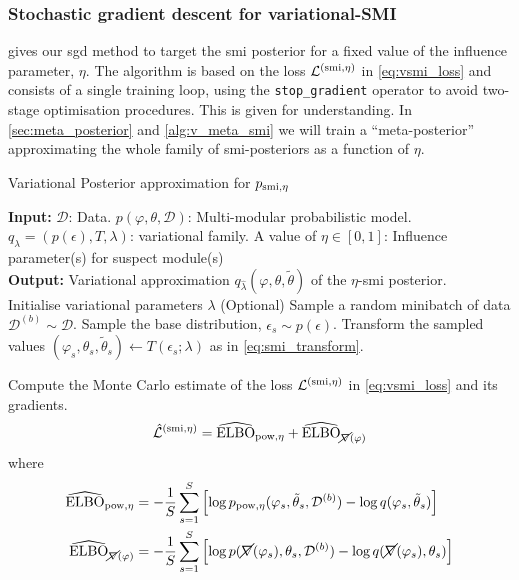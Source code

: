\subsubsection{Stochastic gradient descent for variational-SMI}
 gives our \acrlong*{sgd} method to target the \acrshort*{smi} posterior for a fixed value of the influence parameter, $\eta$.
The algorithm is based on the loss $\mathcal{L}^{( \operatorname{\text{smi}}, \eta)}$ in \cref{eq:vsmi_loss} and consists of a single training loop, using the \verb|stop_gradient| operator to avoid two-stage optimisation procedures. This is given for understanding. In \cref{sec:meta_posterior} and \cref{alg:v_meta_smi} we will train a ``meta-posterior'' approximating the whole family of \acrshort*{smi}-posteriors as a function of $\eta$.
 
\begin{algorithm}[tb]
  \caption{Variational Posterior approximation for $p_{ \operatorname{\text{smi}}, \eta}$} \label{alg:vsmi}
  \begin{algorithmic}
    \STATE \textbf{Input:} $\mathcal{D}$: Data. $p(\varphi,\theta,\mathcal{D})$: Multi-modular probabilistic model. $q_\lambda=(p(\epsilon), T, \lambda)$: variational family. A value of $\eta \in [0,1]$: Influence parameter(s) for suspect module(s) \\[0.1in]
    \STATE \textbf{Output:} Variational approximation $q_{\hat\lambda}(\varphi,\theta,\tilde\theta)$ of the $\eta$-\acrshort*{smi} posterior. \\[0.1in]

    \STATE Initialise variational parameters $\lambda$
    \STATE (Optional) Sample a random minibatch of data $\mathcal{D}^{(b)} \sim \mathcal{D}$.
    \STATE Sample the base distribution, $\epsilon_s \sim p(\epsilon)$.
    \STATE Transform the sampled values $(\varphi_s, \theta_s, \tilde\theta_s) \leftarrow T(\epsilon_s; \lambda)$ as in \cref{eq:smi_transform}.
    \ENDFOR

    \STATE Compute the Monte Carlo estimate of the loss $\mathcal{L}^{( \operatorname{\text{smi}}, \eta)}$ in \cref{eq:vsmi_loss} and its gradients.
    \begin{equation}
      \hat{\mathcal{L}}^{( \operatorname{\text{smi}}, \eta)} = \widehat{\operatorname{\text{ELBO}}}_{\operatorname{\text{pow}}, \eta} + \widehat{\operatorname{\text{ELBO}}}_{\cancel{\nabla}(\varphi)}
    \end{equation}
    where
    \begin{align}
      \widehat{\operatorname{\text{ELBO}}}_{\operatorname{\text{pow}}, \eta}               & = - \frac{1}{S} \sum_{s=1}^{S} \left[ \log p_{\operatorname{\text{pow}}, \eta}(\varphi_{s}, \tilde\theta_{s}, \mathcal{D}^{(b)}) - \log q(\varphi_{s}, \tilde\theta_{s}) \right]           \\
      \widehat{\operatorname{\text{ELBO}}}_{\cancel{\nabla}(\varphi)} & = - \frac{1}{S} \sum_{s=1}^{S} \left[ \log p(\cancel{\nabla}(\varphi_{s}), \theta_{s}, \mathcal{D}^{(b)}) - \log q( \cancel{\nabla}(\varphi_{s}), \theta_{s}) \right]
    \end{align}


\end{algorithmic}
\end{algorithm}
